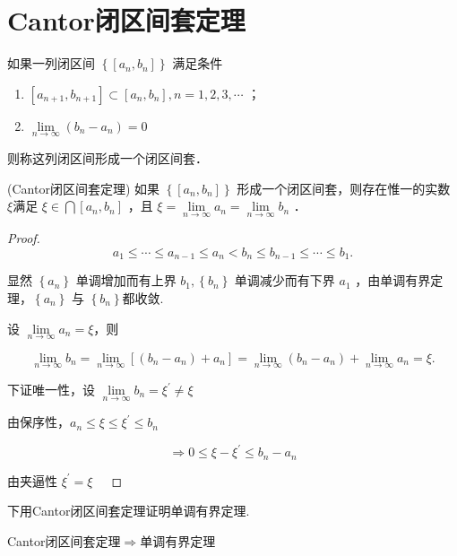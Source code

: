 \section{Cantor闭区间套定理}
\begin{definition}
	如果一列闭区间 $\left\{\left[a_n, b_n\right]\right\}$ 满足条件
	\begin{enumerate}
		\item $\left[a_{n+1}, b_{n+1}\right] \subset\left[a_n, b_n\right], n=1,2,3, \cdots$ ；
		\item $\lim\limits_{n \rightarrow \infty}\left(b_n-a_n\right)=0$ 
	\end{enumerate}
	则称这列闭区间形成一个闭区间套．
\end{definition}

\begin{theorem}
	(Cantor闭区间套定理)
	如果 $\left\{\left[a_n, b_n\right]\right\}$ 形成一个闭区间套，则存在惟一的实数 $\xi$满足 $\xi\in\bigcap \left[a_n, b_n\right]$ ，且 $\xi=\lim\limits _{n \rightarrow \infty} a_n=\lim\limits _{n \rightarrow \infty} b_n$ ．
\end{theorem}
\begin{proof}
	$$
	a_1 \leqslant \cdots \leqslant a_{n-1} \leqslant a_n<b_n \leqslant b_{n-1} \leqslant \cdots \leqslant b_1 .
	$$
	
	
	显然 $\left\{a_n\right\}$ 单调增加而有上界 $b_1,\left\{b_n\right\}$ 单调减少而有下界 $a_1$ ，由单调有界定理，$\left\{a_n\right\}$ 与 $\left\{b_n\right\}$都收敛.
	
	设 $\lim\limits_{n \rightarrow \infty}a_n=\xi$，则
	
	$$
	\lim _{n \rightarrow \infty} b_n=\lim _{n \rightarrow \infty}\left[\left(b_n-a_n\right)+a_n\right]=\lim _{n \rightarrow \infty}\left(b_n-a_n\right)+\lim _{n \rightarrow \infty} a_n=\xi .
	$$
	
	下证唯一性，设 $\lim\limits_{n\rightarrow\infty} b_n=\xi^{\prime} \neq \xi$
	
	由保序性，$a_n \leqslant \xi \leqslant \xi^{\prime} \leqslant b_n$
	
	$$
	\Rightarrow 0 \leqslant \xi-\xi^{\prime} \leqslant b_n-a_n
	$$
	
	
	由夹逼性 $\xi^{\prime}=\xi \quad$ 
	
\end{proof}
下用Cantor闭区间套定理证明单调有界定理.
\begin{proposition}
	Cantor闭区间套定理$\Rightarrow$单调有界定理
\end{proposition}

